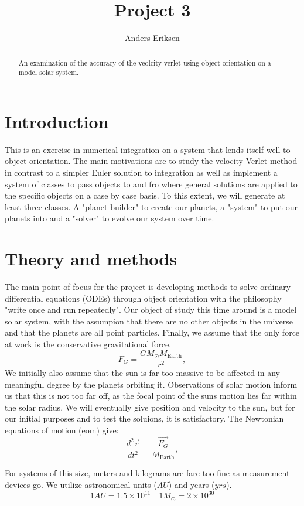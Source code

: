 \documentclass[10pt, twocolumn]{revtex4-1}
\begin{document}
\title{Project 3}
\author{Anders Eriksen}
\begin{abstract}
    An examination of the accuracy of the veolcity verlet using object orientation on a model
    solar system. 
\end{abstract}
\maketitle


\section{Introduction}
This is an exercise in numerical integration on a system that lends itself well to object orientation. 
The main motivations are to study the velocity Verlet method in contrast to a simpler Euler solution 
to integration as well as implement a system of classes to pass objects to and fro where general 
solutions are applied to the specific objects on a case by case basis. To this extent, we will generate
at least three classes. A "planet builder" to create our planets, a "system" to put our planets into and
a "solver" to evolve our system over time. 

\section{Theory and methods}

The main point of focus for the project is developing methods to
solve ordinary differential equations (ODEs) through object orientation with the philosophy "write once and run repeatedly".
Our object of study this time around is a model solar system, with the assumpion that there are no other objects in the universe
and that the planets are all point particles. Finally, we assume that the only force at work is the conservative gravitational force. 
\[
F_G=\frac{GM_{\odot}M_{\mathrm{Earth}}}{r^2},
\]
We initially also assume that the sun is far too massive to be affected in any meaningful degree by the planets orbiting it. 
Observations of solar motion inform us that this is not too far off, as the focal point of the suns motion lies far within the 
solar radius. We will eventually give position and velocity to the sun, but for our initial purposes and to test the soluions, it 
is satisfactory. The Newtonian equations of motion (eom) give: 
\[
    \frac{d^2\vec{r}}{dt^2}=\frac{\vec{F_{G}}}{M_{\mathrm{Earth}}},
\]

For systems of this size, meters and kilograms are fare too fine as measurement devices go. We utilize astronomical units ($AU$)
and years ($yrs$). 
\[
    1 AU = 1.5\times 10^{11} \quad 1 M_{\odot} = 2\times 10^{30}
\]
\end{document}
